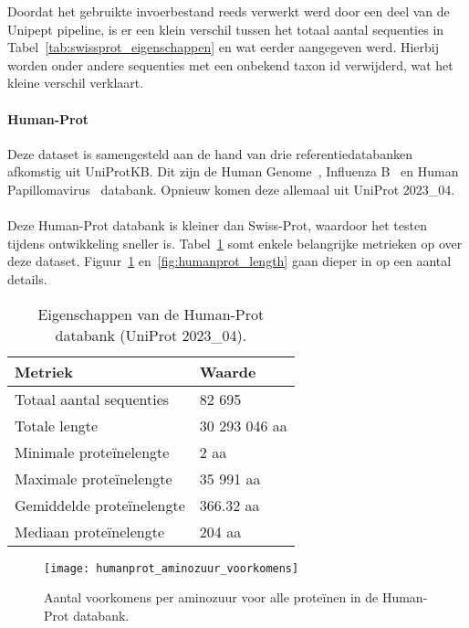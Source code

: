 Doordat het gebruikte invoerbestand reeds verwerkt werd door een deel van de Unipept pipeline, is er een klein verschil tussen het totaal aantal sequenties in Tabel~\ref{tab:swissprot_eigenschappen} en wat eerder aangegeven werd.
Hierbij worden onder andere sequenties met een onbekend taxon id verwijderd, wat het kleine verschil verklaart.

\paragraph{Human-Prot} Deze dataset is samengesteld aan de hand van drie referentiedatabanken afkomstig uit UniProtKB\@.
Dit zijn de Human Genome~\cite{proteomes_homo_sapiens}, Influenza B~\cite{proteomes_infuenza_b} en Human Papillomavirus~\cite{proteomes_human_papillomavirus} databank.
Opnieuw komen deze allemaal uit UniProt 2023\_04.
\\ \\
Deze Human-Prot databank is kleiner dan Swiss-Prot, waardoor het testen tijdens ontwikkeling sneller is.
Tabel~\ref{tab:humanprot_eigenschappen} somt enkele belangrijke metrieken op over deze dataset.
Figuur~\ref{fig:humanprot_aminozuur} en~\ref{fig:humanprot_length} gaan dieper in op een aantal details.

\begin{table}[h!]
    \centering
    \begin{tabular}{ l l }
        Metriek                   & Waarde        \\
        \hline\hline
        Totaal aantal sequenties  & 82 695        \\
        Totale lengte             & 30 293 046 aa \\
        Minimale proteïnelengte   & 2 aa          \\
        Maximale proteïnelengte   & 35 991 aa     \\
        Gemiddelde proteïnelengte & 366.32 aa     \\
        Mediaan proteïnelengte    & 204 aa        \\
        \hline
    \end{tabular}
    \caption{Eigenschappen van de Human-Prot databank (UniProt 2023\_04).}
    \label{tab:humanprot_eigenschappen}
\end{table}

\begin{figure}[H]
    \centering
    \texttt{[image: humanprot\_aminozuur\_voorkomens]}
    \caption{Aantal voorkomens per aminozuur voor alle proteïnen in de Human-Prot databank.}
    \label{fig:humanprot_aminozuur}
\end{figure}

